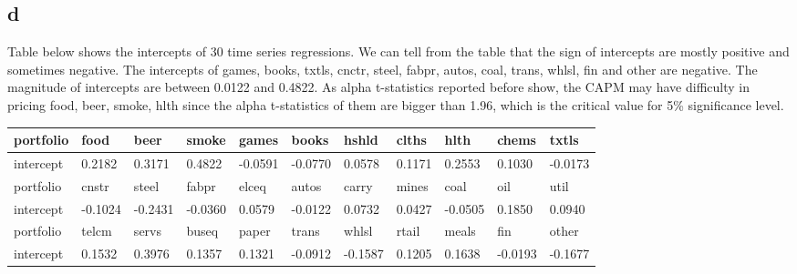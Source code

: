 \documentclass{report}
\begin{document}
\subsection{d}
Table below shows the intercepts of 30 time series regressions. We can tell from the table that the sign of intercepts are mostly positive and sometimes negative. The intercepts of games, books, txtls, cnctr, steel, fabpr, autos, coal, trans, whlsl, fin and other are negative. The magnitude of intercepts are between 0.0122 and 0.4822. As alpha t-statistics reported before show, the CAPM may have difficulty in pricing food, beer, smoke, hlth since the alpha t-statistics of them are bigger than 1.96, which is the critical value for 5\% significance level.
\begin{table}[H]
\begin{tabular}{@{}|l|llllllllll@{}}
\toprule
portfolio & \multicolumn{1}{l|}{food}  & \multicolumn{1}{l|}{beer}  & \multicolumn{1}{l|}{smoke} & \multicolumn{1}{l|}{games} & \multicolumn{1}{l|}{books} & \multicolumn{1}{l|}{hshld} & \multicolumn{1}{l|}{clths} & \multicolumn{1}{l|}{hlth}  & \multicolumn{1}{l|}{chems} & \multicolumn{1}{l|}{txtls} \\ \midrule
intercept & 0.2182                     & 0.3171                     & 0.4822                     & -0.0591                    & -0.0770                    & 0.0578                     & 0.1171                     & 0.2553                     & 0.1030                     & -0.0173                    \\ \midrule
portfolio & \multicolumn{1}{l|}{cnstr} & \multicolumn{1}{l|}{steel} & \multicolumn{1}{l|}{fabpr} & \multicolumn{1}{l|}{elceq} & \multicolumn{1}{l|}{autos} & \multicolumn{1}{l|}{carry} & \multicolumn{1}{l|}{mines} & \multicolumn{1}{l|}{coal}  & \multicolumn{1}{l|}{oil}   & \multicolumn{1}{l|}{util}  \\ \midrule
intercept & -0.1024                    & -0.2431                    & -0.0360                    & 0.0579                     & -0.0122                    & 0.0732                     & 0.0427                     & -0.0505                    & 0.1850                     & 0.0940                     \\ \midrule
portfolio & \multicolumn{1}{l|}{telcm} & \multicolumn{1}{l|}{servs} & \multicolumn{1}{l|}{buseq} & \multicolumn{1}{l|}{paper} & \multicolumn{1}{l|}{trans} & \multicolumn{1}{l|}{whlsl} & \multicolumn{1}{l|}{rtail} & \multicolumn{1}{l|}{meals} & \multicolumn{1}{l|}{fin}   & \multicolumn{1}{l|}{other} \\ \midrule
intercept & 0.1532                     & 0.3976                     & 0.1357                     & 0.1321                     & -0.0912                    & -0.1587                    & 0.1205                     & 0.1638                     & -0.0193                    & -0.1677                    \\ \cmidrule(r){1-1}
\end{tabular}
\end{table}
\end{document}
